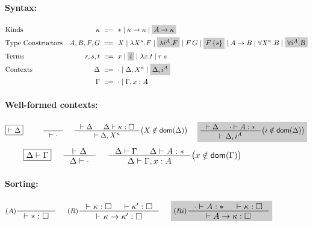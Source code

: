 \begin{figure}
\begin{framed}
\paragraph{Syntax:}
\begin{align*}
\!\!\!\!\!\!\!\!&\text{Kinds}
 	& \kappa		&~ ::= ~ *
				\mid \kappa -> \kappa
				\mid \newFi{A -> \kappa}
\\
\!\!\!\!\!\!\!\!&\text{Type Constructors}
	& A,B,F,G		&~ ::= ~ X
				\mid \lambda X^\kappa.F
				\mid \newFi{\lambda i^A.F}
				\mid F\,G
				\mid \newFi{F\,\{s\}}
				\mid A -> B
				\mid \forall X^\kappa . B
				\mid \newFi{\forall i^A . B}
\\
\!\!\!\!\!\!\!\!&\text{Terms}
	& r,s,t			&~ ::= ~ x \mid \newFi{i}
                                \mid \lambda x.t \mid r\;s
\\
\!\!\!\!\!\!\!\!&\text{Contexts}
	& \Delta		&~ ::= ~ \cdot
				\mid \Delta, X^\kappa
				\mid \newFi{\Delta, i^A} \\
&	& \Gamma		&~ ::= ~ \cdot
				\mid \Gamma, x : A
\end{align*}

\paragraph{Well-formed contexts:}
\[ \fbox{$|- \Delta$}
 ~~~~ ~~~~
   \inference{}{|- \cdot}
 ~~~~
   \inference{|- \Delta & \Delta |- \kappa:\square}
             {|- \Delta,X^\kappa}
      \big( X\notin\dom(\Delta) \big)
 ~~~~ \newFi{
   \inference{|- \Delta & \cdot |- A:*}
             {|- \Delta,i^A}
      \big( i\notin\dom(\Delta) \big) }
\]
\[ \fbox{$\Delta |- \Gamma$}
 ~~~~
   \inference{|- \Delta}{\Delta |- \cdot}
 ~~~~
   \inference{\Delta |- \Gamma & \Delta |- A:*}
             {\Delta |- \Gamma,x:A}
      \big( x\notin\dom(\Gamma) \big)
\]


\paragraph{Sorting:} \fbox{$|- \kappa : \square$}
\[ \inference[($A$)]{}{|- *:\square}
 ~~~~
   \inference[($R$)]{|- \kappa:\square & |- \kappa':\square}
                    {|- \kappa -> \kappa' : \square}
 ~~~~
   \newFi{
   \inference[($Ri$)]{\cdot |- A:* & |- \kappa:\square}
                     {|- A -> \kappa : \square} }
\]


\end{framed}
\end{figure}
